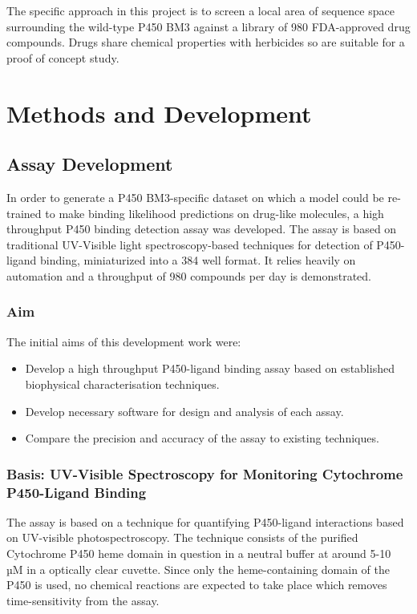 \documentclass{article}
\begin{document}
The specific approach in this project is to screen a local area of sequence space surrounding the wild-type P450 BM3 against a library of 980 FDA-approved drug compounds.
Drugs share chemical properties with herbicides so are suitable for a proof of concept study.

\section{Methods and Development}
\subsection{Assay Development}

In order to generate a P450 BM3-specific dataset on which a model could be re-trained to make binding likelihood predictions on drug-like molecules, a high throughput P450 binding detection assay was developed.
The assay is based on traditional UV-Visible light spectroscopy-based techniques for detection of P450-ligand binding, miniaturized into a 384 well format. 
It relies heavily on automation and a throughput of 980 compounds per day is demonstrated.

\subsubsection{Aim}

The initial aims of this development work were:

\begin{itemize}
	\item Develop a high throughput P450-ligand binding assay based on established biophysical characterisation techniques.
	\item Develop necessary software for design and analysis of each assay.
	\item Compare the precision and accuracy of the assay to existing techniques.
\end{itemize}

\subsubsection{Basis: UV-Visible Spectroscopy for Monitoring Cytochrome P450-Ligand Binding}

The assay is based on a technique for quantifying P450-ligand interactions based on UV-visible photospectroscopy.
The technique consists of the purified Cytochrome P450 heme domain in question in a neutral buffer at around 5-10 µM in a optically clear cuvette.
Since only the heme-containing domain of the P450 is used, no chemical reactions are expected to take place which removes time-sensitivity from the assay.
\par
\end{document}
